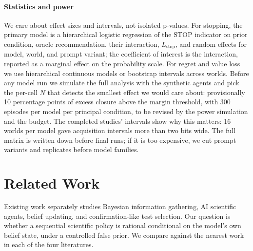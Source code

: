 \documentclass[10pt,letterpaper,twocolumn]{article}
\newcommand{\STOP}{\mathrm{STOP}}
\newcommand{\Lstop}{L_{\mathrm{stop}}}
\begin{document}
\paragraph{Statistics and power}
\label{sec:stats}
We care about effect sizes and intervals, not isolated p-values. For stopping, the primary model is a hierarchical logistic regression of the $\STOP$ indicator on prior condition, oracle recommendation, their interaction, $\Lstop$, and random effects for model, world, and prompt variant; the coefficient of interest is the interaction, reported as a marginal effect on the probability scale. For regret and value loss we use hierarchical continuous models or bootstrap intervals across worlds. Before any model run we simulate the full analysis with the synthetic agents and pick the per-cell $N$ that detects the smallest effect we would care about: provisionally 10 percentage points of excess closure above the margin threshold, with 300 episodes per model per principal condition, to be revised by the power simulation and the budget. The completed studies' intervals show why this matters: 16 worlds per model gave acquisition intervals more than two bits wide. The full matrix is written down before final runs; if it is too expensive, we cut prompt variants and replicates before model families.

\section{Related Work}
\label{sec:related}

Existing work separately studies Bayesian information gathering, AI scientific agents, belief updating, and confirmation-like test selection. Our question is whether a sequential scientific policy is rational conditional on the model's own belief state, under a controlled false prior. We compare against the nearest work in each of the four literatures.
\end{document}
